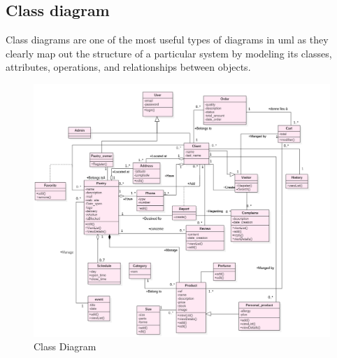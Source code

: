 \documentclass[12pt,a4paper]{report}
\begin{document}
	\subsection{Class diagram}
	Class diagrams are one of the most useful types of diagrams in \ac{uml} \cite{umlBook} as they clearly map out the structure of a particular system by modeling its classes, attributes, operations, and relationships between objects.
	
	
	
	\vspace*{2cm}
	\begin{figure}[H]
		\centering
		\includegraphics[width=7.7in,keepaspectratio]{class.png}
		\caption{Class Diagram}
	\end{figure}
	
\end{document}
